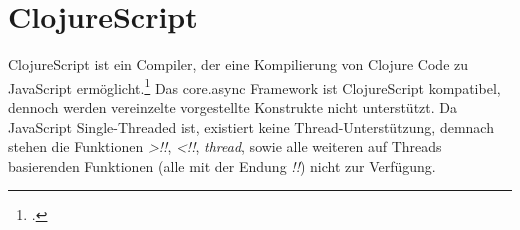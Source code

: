 \section{ClojureScript}
ClojureScript ist ein Compiler, der eine Kompilierung von Clojure Code zu JavaScript ermöglicht.\footcite{CLJS} Das core.async Framework ist ClojureScript kompatibel, dennoch werden vereinzelte vorgestellte Konstrukte nicht unterstützt. Da JavaScript Single-Threaded ist, existiert keine Thread-Unterstützung, demnach stehen die Funktionen \textit{>!!}, \textit{<!!}, \textit{thread}, sowie alle weiteren auf Threads basierenden Funktionen (alle mit der Endung \textit{!!}) nicht zur Verfügung.
\acresetall
